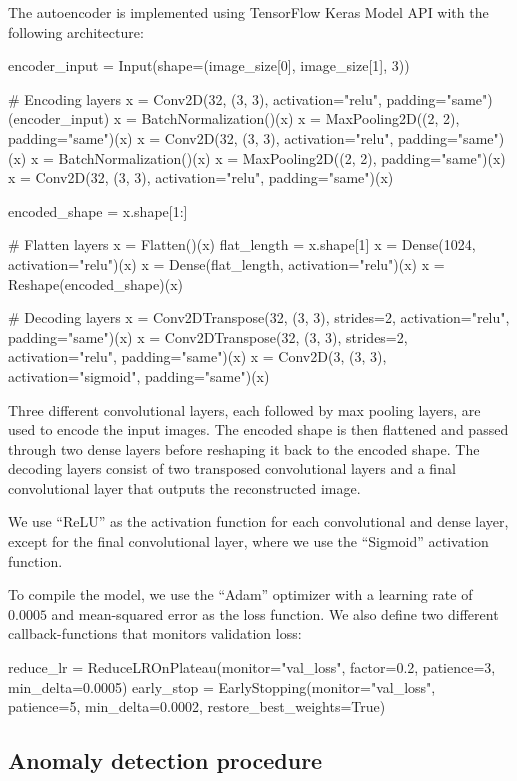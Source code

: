 The autoencoder is implemented using TensorFlow Keras Model API with the following architecture:
\vspace{0.3cm}
\begin{python}
encoder_input = Input(shape=(image_size[0], image_size[1], 3))

# Encoding layers
x = Conv2D(32, (3, 3), activation="relu", padding="same")(encoder_input)
x = BatchNormalization()(x)
x = MaxPooling2D((2, 2), padding="same")(x)
x = Conv2D(32, (3, 3), activation="relu", padding="same")(x)
x = BatchNormalization()(x)
x = MaxPooling2D((2, 2), padding="same")(x)
x = Conv2D(32, (3, 3), activation="relu", padding="same")(x)

encoded_shape = x.shape[1:]

# Flatten layers
x = Flatten()(x)
flat_length = x.shape[1]
x = Dense(1024, activation="relu")(x)
x = Dense(flat_length, activation="relu")(x)
x = Reshape(encoded_shape)(x)

# Decoding layers
x = Conv2DTranspose(32, (3, 3), strides=2, activation="relu", padding="same")(x)
x = Conv2DTranspose(32, (3, 3), strides=2, activation="relu", padding="same")(x)
x = Conv2D(3, (3, 3), activation="sigmoid", padding="same")(x)
\end{python}

Three different convolutional layers, each followed by max pooling layers, are used to encode the input images. The encoded shape is then flattened and passed through two dense layers before reshaping it back to the encoded shape. The decoding layers consist of two transposed convolutional layers and a final convolutional layer that outputs the reconstructed image.
\par
We use ``ReLU'' as the activation function for each convolutional and dense layer, except for the final convolutional layer, where we use the ``Sigmoid'' activation function. 
\par
To compile the model, we use the ``Adam'' optimizer with a learning rate of $0.0005$ and mean-squared error as the loss function. We also define two different callback-functions that monitors validation loss:
\begin{python}
reduce_lr = ReduceLROnPlateau(monitor="val_loss", factor=0.2, patience=3, min_delta=0.0005)
early_stop = EarlyStopping(monitor="val_loss", patience=5, min_delta=0.0002, restore_best_weights=True)
\end{python}

\subsection{Anomaly detection procedure}

